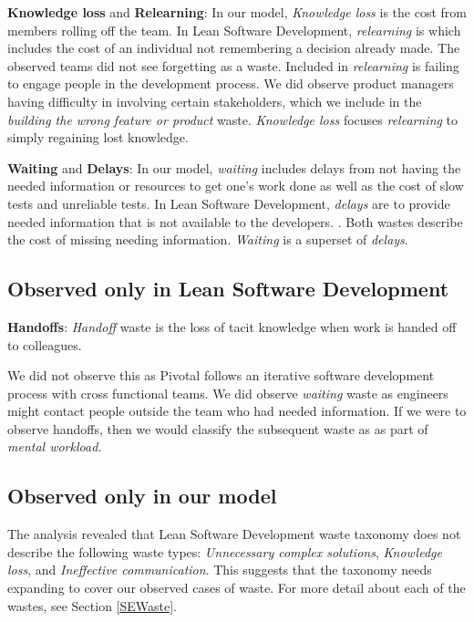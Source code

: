 \textbf{Knowledge loss} and \textbf{Relearning}:
 In our model, \textit{Knowledge loss} is the cost from members rolling off the team. In Lean Software Development, \textit{relearning} is  \cite{PoppendieckConceptToCash} which includes the cost of an individual not remembering a decision already made. The observed teams did not see forgetting as a waste.  Included in \textit{relearning} is failing to engage people in the development process. We did observe product managers having difficulty in involving certain stakeholders, which we include in the \textit{building the wrong feature or product} waste. \textit{Knowledge loss} focuses \textit{relearning} to simply regaining lost knowledge. 

\textbf{Waiting} and \textbf{Delays}: In our model, \textit{waiting} includes delays from not having the needed information or resources to get one's work done as well as the cost of slow tests and unreliable tests. In Lean Software Development, \textit{delays} are  to provide needed information that is not available to the developers. \cite{PoppendieckConceptToCash}. Both wastes describe the cost of missing needing information. \textit{Waiting} is a superset of \textit{delays}.
\subsection{Observed only in Lean Software Development}

\textbf{Handoffs}: \textit{Handoff} waste is the loss of tacit knowledge when work is handed off to colleagues.

We did not observe this as Pivotal follows an iterative software development process with cross functional teams. We did observe \textit{waiting} waste as engineers might contact people outside the team who had needed information. If we were to observe handoffs, then we would classify the subsequent waste as  as part of \textit{mental workload.} 
\subsection{Observed only in our model}
The analysis revealed that Lean Software Development waste taxonomy does not describe the following waste types: \textit{Unnecessary complex solutions}, \textit{Knowledge loss}, and \textit{Ineffective communication}. This suggests that the taxonomy needs expanding to cover our observed cases of waste. For more detail about each of the wastes, see Section \ref{SEWaste}.
